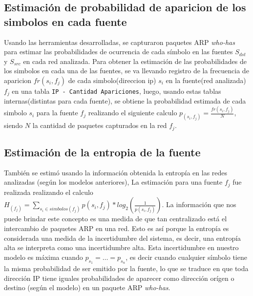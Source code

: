 \subsection{Estimaci\'on de probabilidad de aparicion de los simbolos en cada fuente}
\par Usando las herramientas desarrolladas, se capturaron paquetes ARP \textit{who-has} para estimar las probabilidades de ocurrencia de cada símbolo en las fuentes $S_{dst}$ y $S_{src}$ en cada red analizada.
Para obtener la estimaci\'on de las probabilidades de los simbolos en cada una de las fuentes, se va llevando registro de la frecuencia de aparicion $fr(s_i, f_j)$ de cada simbolo(direccion ip) $s_i$ en la fuente(red analizada)$f_j$ en una tabla \texttt{IP - Cantidad Apariciones}, luego, usando estas tablas internas(distintas para cada fuente), se obtiene la probabilidad estimada de cada simbolo $s_i$ para la fuente $f_j$ realizando el siguiente calculo $p_{(s_i, f_j)} = \frac{fr(s_i, f_j)}{N}$, siendo $N$ la cantidad de paquetes capturados en la red $f_j$.
\\
\subsection{Estimaci\'on de la entropia de la fuente}
También se estimó usando la información obtenida la entropía en las redes analizadas (según los modelos anteriores), La estimaci\'on para una fuente $f_j$ fue realizada realizando el calculo $H_{(f_j)} = \sum\limits_{s_i \in simbolos(f_j)} p(s_i, f_j) * log_2(\frac{1}{p(s_i,f_j)})$.
La información que nos puede brindar este concepto es una medida de que tan centralizado está el intercambio de paquetes ARP en una red. Esto es así porque la entropía es considerada una medida de la incertidumbre del sistema, es decir, una entropía alta se interpreta como una incertidumbre alta. Esta incertidumbre en nuestro modelo es máxima cuando $p_{s_1} = \dots = p_{s_n}$, es decir cuando cualquier símbolo tiene la misma probabilidad de ser emitido por la fuente, lo que se traduce en que toda dirección IP tiene iguales probabilidades de aparecer como dirección orígen o destino (según el modelo) en un paquete ARP \textit{who-has}.
 
